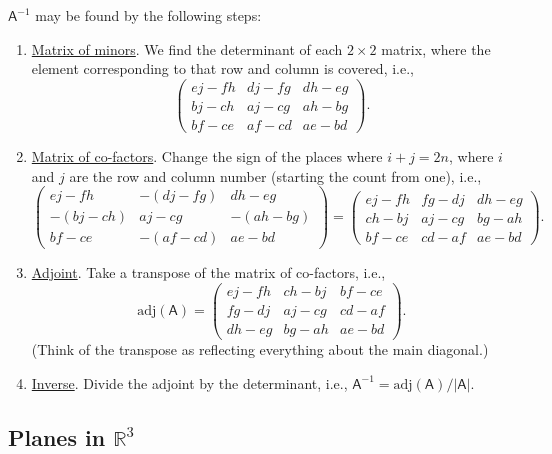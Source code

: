\documentclass[10pt,notitlepage]{revtex4-1}
\begin{document}
$\mathsf{A}^{-1}$ may be found by the following steps:
\begin{enumerate}
	\item \underline{Matrix of minors}. We find the determinant of each
	$2\times2$ matrix, where the element corresponding to that row and column is
	covered, i.e.,
	\begin{equation}
		\begin{pmatrix}ej-fh & dj-fg & dh-eg\\ bj-ch & aj-cg & ah-bg\\
		bf-ce & af-cd & ae-bd
		\end{pmatrix}.
	\end{equation}
	\item \underline{Matrix of co-factors}. Change the sign of the places where
	$i+j=2n$, where $i$ and $j$ are the row and column number (starting the
	count from one), i.e.,
	\begin{equation}
		\begin{pmatrix}ej-fh & -(dj-fg) & dh-eg\\ -(bj-ch) & aj-cg & -(ah-bg)\\
		bf-ce & -(af-cd) & ae-bd
		\end{pmatrix}=
		\begin{pmatrix}ej-fh & fg-dj & dh-eg\\ ch-bj & aj-cg & bg-ah\\
		bf-ce & cd-af & ae-bd
		\end{pmatrix}.
	\end{equation}
	\item \underline{Adjoint}. Take a transpose of the matrix of co-factors,
	i.e.,
	\begin{equation}
		\mbox{adj}(\mathsf{A})=\begin{pmatrix}ej-fh & ch-bj & bf-ce \\ 
		fg-dj & aj-cg & cd-af\\ dh-eg & bg-ah & ae-bd
		\end{pmatrix}.
	\end{equation}
	(Think of the transpose as reflecting everything about the main diagonal.)
	\item \underline{Inverse}. Divide the adjoint by the determinant, i.e.,
	$\mathsf{A}^{-1}=\mbox{adj}(\mathsf{A})/|\mathsf{A}|$.
\end{enumerate}


\subsection{Planes in $\mathbb{R}^3$}
\end{document}
